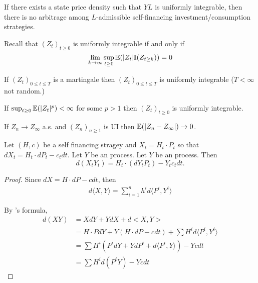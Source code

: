 \begin{thm}
  \label{defn:continuous_time:23}
  If there exists a state price density such that $YL$ is uniformly
  integrable, then there is no arbitrage among $L$-admissible
  self-financing investment/consumption strategies.
\end{thm}

\begin{remark}
  Recall that $(Z_{t})_{t \geq 0}$ is uniformly integrable if and only
  if
  \begin{equation}
    \label{eq:59}
    \lim_{k \rightarrow \infty} \sup_{t \geq 0} \E{|Z_{t}|\I{Z_{t \geq
        k}}} = 0
  \end{equation}
\end{remark}

\begin{remark}
  If $(Z_{t})_{0 \leq t \leq T}$ is a martingale then $(Z_{t})_{0 \leq t
  \leq T}$ is uniformly integrable ($T < \infty$ not random.)
\end{remark}

\begin{remark}
  If $\sup_{t \geq 0} \E{|Z_{t}|^{p}} < \infty$ for some $p > 1$ then
  $(Z_{t})_{t \geq 0}$ is uniformly integrable.
\end{remark}

\begin{remark}
  If $Z_{n} \rightarrow Z_{\infty}$ a.s. and $(Z_{n})_{n \geq 1}$ is
  UI then $\E{|Z_{n} - Z_{\infty}|} \rightarrow 0$.
\end{remark}

\begin{proposition}
  Let $(H, c)$ be a self financing stragey and $X_{t} = H_{t} \cdot
  P_{t}$ so that $dX_{t} = H_{t} \cdot dP_{t} - c_{t} dt$.  Let $Y$ be
  an \ito process.  Let $Y$ be an \ito process.  Then
  \begin{equation}
    \label{eq:60}
    d(X_{t} Y_{t} ) = H_{t} \cdot (dY_{t}P_{t}) - Y_{t} c_{t} dt.
  \end{equation}
\end{proposition}

\begin{proof}
  Since $dX = H \cdot dP - c dt$, then
  \begin{align}
    \label{eq:61}
    d \langle X, Y \rangle = \sum_{i=1}^{n} h^{i} d \langle P^{i},
    Y^{i} \rangle
  \end{align}

  By \ito's formula,
  \begin{align}
    \label{eq:62}
    d(XY) &= XdY + YdX + d<X, Y>  \\
    &= H \cdot P dY + Y(H \cdot dP - c dt) + \sum H^{i} d \langle
    P^{i}, Y^{i} \rangle \\
    &= \sum H^{i}(P^{i} dY + Y dP^{i} + d \langle P^{i}, Y \rangle) -
    Y c dt \\
    &= \sum H^{i} d(P^{i} Y) - Yc dt
  \end{align}
\end{proof}

